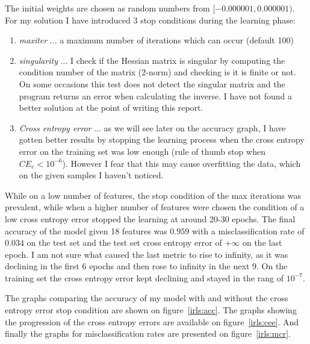 \documentclass[a4paper,11pt]{article}
\begin{document}
The initial weights are chosen as random numbers from $[-0.000001, 0.000001)$. For my solution I have introduced 3 stop conditions during the learning phase:
\begin{enumerate}
 \item \textit{maxiter} ... a maximum number of iterations which can occur (default 100)
 \item \textit{singularity} ... I check if the Hessian matrix is singular by computing the condition number of the matrix (2-norm) and checking is it is finite or not. On some occasions this test does not detect the singular matrix and the program returns an error when calculating the inverse. I have not found a better solution at the point of writing this report.
 \item \textit{Cross entropy error} ... as we will see later on the accuracy graph, I have gotten better results by stopping the learning process when the cross entropy error on the training set was low enough (rule of thumb stop when $CE_e<10^{-6}$). However I fear that this may cause overfitting the data, which on the given samples I haven't noticed.
\end{enumerate}
While on a low number of features, the stop condition of the max iterations was prevalent, while when a higher number of features were chosen the condition of a low cross entropy error stopped the learning at around 20-30 epochs.
The final accuracy of the model given 18 features was $0.959$ with a misclassification rate of $0.034$ on the test set and the test set cross entropy error of $+\infty$ on the last epoch. I am not sure what caused the last metric to rise to infinity, as it was declining in the first 6 epochs and then rose to infinity in the next 9. On the training set the cross entropy error kept declining and stayed in the rang of $10^{-7}$.

The graphs comparing the accuracy of my model with and without the cross entropy error stop condition are shown on figure~\ref{irls:acc}. The graphs showing the progression of the cross entropy errors are available on figure~\ref{irls:cee}. And finally the graphs for misclassification rates are presented on figure~\ref{irls:mcr}.
\end{document}
